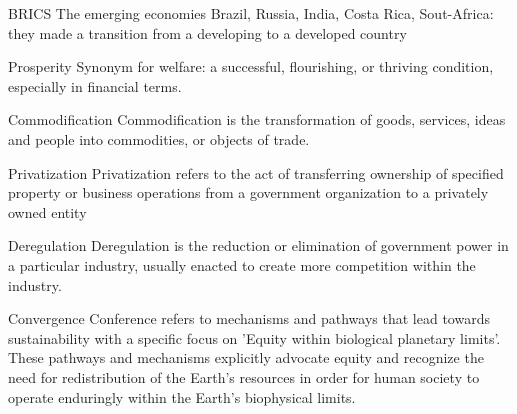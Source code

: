 \begin{sortEnvironment}{BRICS}
The emerging economies Brazil, Russia, India, Costa Rica, Sout-Africa: they made a transition from a developing to a developed country
\end{sortEnvironment}

\begin{sortEnvironment}{Prosperity}
Synonym for welfare: a successful, flourishing, or thriving condition, especially in financial terms.
\end{sortEnvironment}

\begin{sortEnvironment}{Commodification}
Commodification is the transformation of goods, services, ideas and people into commodities, or objects of trade.
\end{sortEnvironment}

\begin{sortEnvironment}{Privatization}
Privatization refers to the act of transferring ownership of specified property or business operations from a government organization to a privately owned entity
\end{sortEnvironment}

\begin{sortEnvironment}{Deregulation}
Deregulation is the reduction or elimination of government power in a particular industry, usually enacted to create more competition within the industry. 
\end{sortEnvironment}

\begin{sortEnvironment}{Convergence} 
Conference refers to mechanisms and pathways that lead towards sustainability with a specific focus on 'Equity within biological planetary limits'. These pathways and mechanisms explicitly advocate equity and recognize the need for redistribution of the Earth's resources in order for human society to operate enduringly within the Earth's biophysical limits. 
\end{sortEnvironment}


